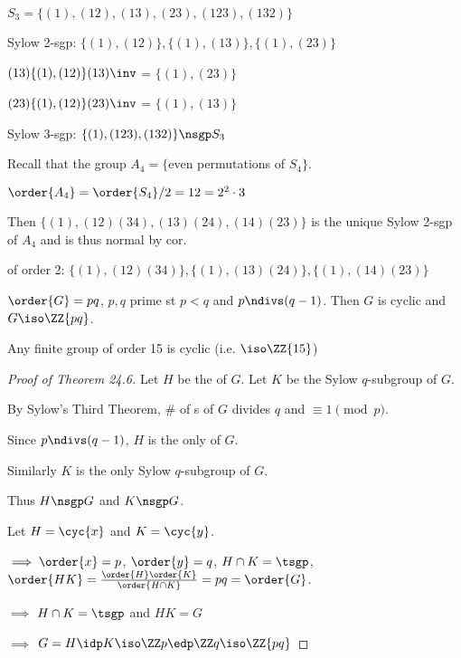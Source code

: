 \begin{example}
  \(S_3 = \{(1), (12), (13), (23), (123), (132)\}\)

  Sylow 2-sgp: \(\{(1), (12)\}, \{(1),(13)\},\{(1),(23)\}\)

  \((13)\{(1),(12)\}(13)\inv\) = \(\{(1),(23)\}\)

  \((23)\{(1),(12)\}(23)\inv\) = \(\{(1),(13)\}\)

  Sylow 3-sgp: \(\{(1),(123),(132)\}\nsgp S_3\)
\end{example}

\begin{example}
  Recall that the group \(A_4 = \{ \)even permutations of \(S_4\}\).

  \(\order{A_4} = \order{S_4}/2=12 = 2^2 \cdot 3\)

  Then \(\{(1), (12)(34), (13)(24), (14)(23)\}\) is the unique Sylow 2-sgp of \(A_4\) and is thus normal by cor.

  \spsgp of order 2: \(\{(1),(12)(34)\},\{(1),(13)(24)\},\{(1),(14)(23)\}\)
\end{example}

\begin{theorem}[24.6]
    \(\order{G}=pq\), \(p,q\) prime st \(p<q\) and \(p\ndivs (q-1)\). Then \(G\) is cyclic and \(G\iso\ZZ{pq}\).
\end{theorem}

\begin{example}
    Any finite group of order 15 is cyclic (i.e. \(\iso\ZZ{15}\))
\end{example}

\begin{proof}[Proof of Theorem 24.6]
    Let \(H\) be the \spsgp of \(G\). Let \(K\) be the Sylow \(q\)-subgroup of \(G\).

    By Sylow's Third Theorem, \# of \spsgp s of \(G\) divides \(q\) and \(\equiv 1\pmod p\).

    Since \(p\ndivs (q-1)\), \(H\) is the only \spsgp of \(G\).

    Similarly \(K\) is the only Sylow \(q\)-subgroup of \(G\).

    Thus \(H\nsgp G\) and \(K\nsgp G\).

    Let \(H=\cyc{x}\) and \(K=\cyc{y}\).

    \(\implies \order{x} = p\), \(\order{y} = q\), \(H\cap K = \tsgp\), \(\order{HK} = \frac{\order{H}\order{K}}{\order{H\cap K}}=pq = \order{G}\).

    \(\implies\) \(H\cap K = \tsgp\) and \(HK=G\)

    \(\implies\) \(G = H\idp K\iso \ZZ p \edp \ZZ q \iso \ZZ{pq}\)
\end{proof}

